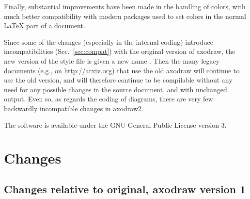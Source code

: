 \documentclass[12pt]{article}
\begin{document}
Finally, substantial improvements have been made in the handling of
colors, with much better compatibility with modern packages used to
set colors in the normal \LaTeX{} part of a document.

Since some of the changes (especially in the internal coding)
introduce incompatibilities (Sec.\ \ref{sec:compat}) with the original
version of axodraw, the new version of the style file is given a new
name .  Then the many legacy documents (e.g., on
\url{http://arxiv.org}) that use the old axodraw will continue to use
the old version, and will therefore continue to be compilable without
any need for any possible changes in the source document, and with
unchanged output.  Even so, as regards the coding of diagrams, there
are very few backwardly incompatible changes in axodraw2.

The software is available under the GNU General Public License
\cite{GPL} version 3.



\section{Changes}
\label{sec:changes}

\subsection{Changes relative to original, axodraw version 1}
\label{sec:changes.wrt.1}
\end{document}
